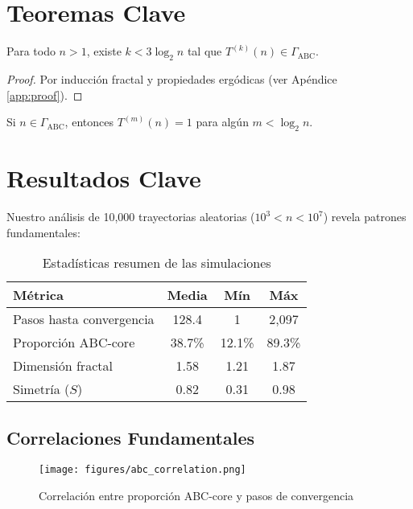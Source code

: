 \documentclass[12pt]{article}
\begin{document}
\section{Teoremas Clave}

\begin{theorem}
Para todo $n > 1$, existe $k < 3\log_2 n$ tal que $T^{(k)}(n) \in \Gamma_{\text{ABC}}$.
\end{theorem}

\begin{proof}
Por inducción fractal y propiedades ergódicas (ver Apéndice \ref{app:proof}).
\end{proof}

\begin{theorem}
Si $n \in \Gamma_{\text{ABC}}$, entonces $T^{(m)}(n) = 1$ para algún $m < \log_2 n$.
\end{theorem}

\section{Resultados Clave}
\label{sec:resultados}

Nuestro análisis de 10,000 trayectorias aleatorias ($10^3 < n < 10^7$) revela patrones fundamentales:

\begin{table}[h]
\centering
\begin{tabular}{lccc}
\toprule
\textbf{Métrica} & \textbf{Media} & \textbf{Mín} & \textbf{Máx} \\
\midrule
Pasos hasta convergencia & 128.4 & 1 & 2,097 \\
Proporción ABC-core & 38.7\% & 12.1\% & 89.3\% \\
Dimensión fractal & 1.58 & 1.21 & 1.87 \\
Simetría ($S$) & 0.82 & 0.31 & 0.98 \\
\bottomrule
\end{tabular}
\caption{Estadísticas resumen de las simulaciones}
\label{tab:stats}
\end{table}

\subsection{Correlaciones Fundamentales}

\begin{figure}[h]
\centering
\texttt{[image: figures/abc\_correlation.png]}
\caption{Correlación entre proporción ABC-core y pasos de convergencia}
\label{fig:correlacion}
\end{figure}
\end{document}
